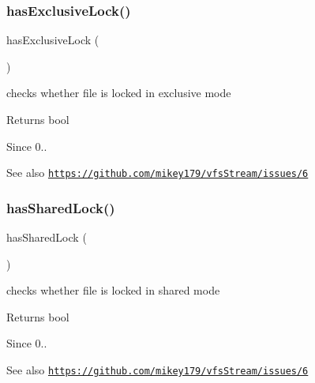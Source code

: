 \subsubsection{\texorpdfstring{has\+Exclusive\+Lock()}{hasExclusiveLock()}}
{\footnotesize\ttfamily has\+Exclusive\+Lock (\begin{DoxyParamCaption}{ }\end{DoxyParamCaption})}

checks whether file is locked in exclusive mode

\begin{DoxyReturn}{Returns}
bool 
\end{DoxyReturn}
\begin{DoxySince}{Since}
0.. 
\end{DoxySince}
\begin{DoxySeeAlso}{See also}
\href{https://github.com/mikey179/vfsStream/issues/6}{\tt https\+://github.\+com/mikey179/vfs\+Stream/issues/6} 
\end{DoxySeeAlso}
\mbox{\label{classorg_1_1bovigo_1_1vfs_1_1vfs_stream_file_a58b9232a345353da75f321b5df95c1c0}} 
\subsubsection{\texorpdfstring{has\+Shared\+Lock()}{hasSharedLock()}}
{\footnotesize\ttfamily has\+Shared\+Lock (\begin{DoxyParamCaption}{ }\end{DoxyParamCaption})}

checks whether file is locked in shared mode

\begin{DoxyReturn}{Returns}
bool 
\end{DoxyReturn}
\begin{DoxySince}{Since}
0.. 
\end{DoxySince}
\begin{DoxySeeAlso}{See also}
\href{https://github.com/mikey179/vfsStream/issues/6}{\tt https\+://github.\+com/mikey179/vfs\+Stream/issues/6} 
\end{DoxySeeAlso}
\mbox{\label{classorg_1_1bovigo_1_1vfs_1_1vfs_stream_file_a19e2d3d0e9debed234d72c560f99b5f2}} 
